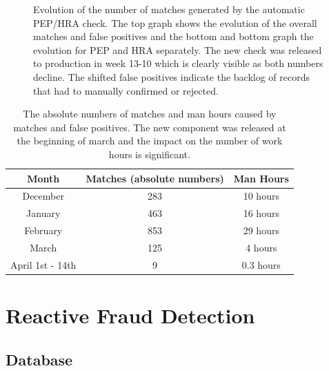\documentclass[a4paper, oneside]{csthesis}
\begin{document}
\begin{figure}
        \caption{Evolution of the number of matches generated by the automatic PEP/HRA check. The top graph shows the evolution of the overall matches and false positives and the bottom and bottom graph the evolution for PEP and HRA separately. The new check was released to production in week 13-10 which is clearly visible as both numbers decline. The shifted false positives indicate the backlog of records that had to manually confirmed or rejected.}
        \label{fig:pep-hra-charts}
\end{figure}



\begin{table}[tb]
    \begin{center}
        \begin{tabular}{c|c|c}Month & Matches (absolute numbers) & Man Hours \\ \hline
        December & 283 & 10 hours \\ \hdashline[0.5pt/3pt]
        January & 463 & 16 hours  \\ \hdashline[0.5pt/3pt]
        February & 853 & 29 hours \\ \hline
        March & 125 & 4 hours \\ \hdashline[0.5pt/3pt]
        April 1st - 14th & 9 & 0.3 hours \\ \hline
        \end{tabular}
    \end{center}
    \caption{The absolute numbers of matches and man hours caused by matches and false positives. The new component was released at the beginning of march and the impact on the number of work hours is significant.}
    \label{tbl:man-hours}
\end{table}


















\section{Reactive Fraud Detection}
\label{sec:exp-reactive}

\subsection{Database}
\end{document}
